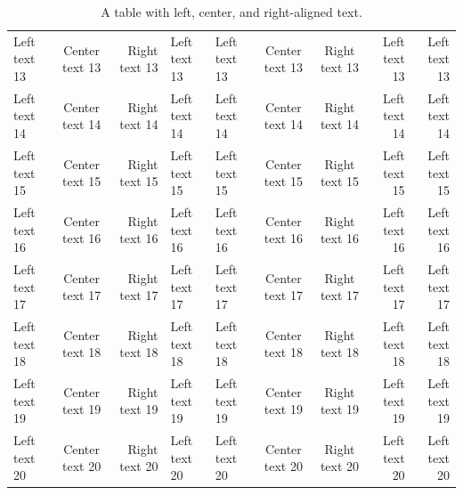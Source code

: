 \documentclass{article}  %
\begin{document}
\begin{table}
{\begin{tabular}{|l|c|r|l|l|c|c|r|r|}
Left text 13 & Center text 13 & Right text 13 & Left text 13 & Left text 13 & Center text 13 & Right text 13 & Left text 13 & Left text 13 \\
Left text 14 & Center text 14 & Right text 14 & Left text 14 & Left text 14 & Center text 14 & Right text 14 & Left text 14 & Left text 14 \\
Left text 15 & Center text 15 & Right text 15 & Left text 15 & Left text 15 & Center text 15 & Right text 15 & Left text 15 & Left text 15 \\
Left text 16 & Center text 16 & Right text 16 & Left text 16 & Left text 16 & Center text 16 & Right text 16 & Left text 16 & Left text 16 \\
Left text 17 & Center text 17 & Right text 17 & Left text 17 & Left text 17 & Center text 17 & Right text 17 & Left text 17 & Left text 17 \\
Left text 18 & Center text 18 & Right text 18 & Left text 18 & Left text 18 & Center text 18 & Right text 18 & Left text 18 & Left text 18 \\
Left text 19 & Center text 19 & Right text 19 & Left text 19 & Left text 19 & Center text 19 & Right text 19 & Left text 19 & Left text 19 \\
Left text 20 & Center text 20 & Right text 20 & Left text 20 & Left text 20 & Center text 20 & Right text 20 & Left text 20 & Left text 20 \\
\hline
\end{tabular}
}
\caption{A table with left, center, and right-aligned text.}
\end{table}
\end{document}
